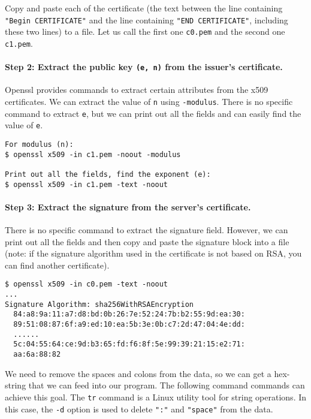 Copy and paste each of the certificate (the text between the line
containing \texttt{"Begin CERTIFICATE"} and the line 
containing \texttt{"END CERTIFICATE"}, including these two lines) to a file. 
Let us call the first one \texttt{c0.pem} and
the second one \texttt{c1.pem}.  

 

\paragraph{Step 2: Extract the public key \texttt{(e, n)} from the issuer's certificate.}
Openssl provides commands to extract certain attributes from the x509 certificates. 
We can extract the value of \texttt{n} using \texttt{-modulus}. There is no specific 
command to extract \texttt{e}, but we can print out all the fields and can easily
find the value of \texttt{e}. 

\begin{lstlisting}
For modulus (n): 
$ openssl x509 -in c1.pem -noout -modulus

Print out all the fields, find the exponent (e): 
$ openssl x509 -in c1.pem -text -noout 
\end{lstlisting}


\paragraph{Step 3: Extract the signature from the server's certificate.}
There is no specific \openssl command to extract the signature field. 
However, we can print out all the fields and then copy and paste 
the signature block into a file (note: 
if the signature algorithm used in the certificate is not based on RSA, 
you can find another certificate). 


\begin{lstlisting}
$ openssl x509 -in c0.pem -text -noout 
...
Signature Algorithm: sha256WithRSAEncryption
  84:a8:9a:11:a7:d8:bd:0b:26:7e:52:24:7b:b2:55:9d:ea:30:
  89:51:08:87:6f:a9:ed:10:ea:5b:3e:0b:c7:2d:47:04:4e:dd:
  ......
  5c:04:55:64:ce:9d:b3:65:fd:f6:8f:5e:99:39:21:15:e2:71:
  aa:6a:88:82
\end{lstlisting}

We need to remove the spaces and colons from the data, so we can get 
a hex-string that we can feed into our program. The following command 
commands can achieve this goal. The \texttt{tr} command is a Linux utility tool for 
string operations. In this case, the \texttt{-d} option is used to delete \texttt{":"} and 
\texttt{"space"} from the data.

